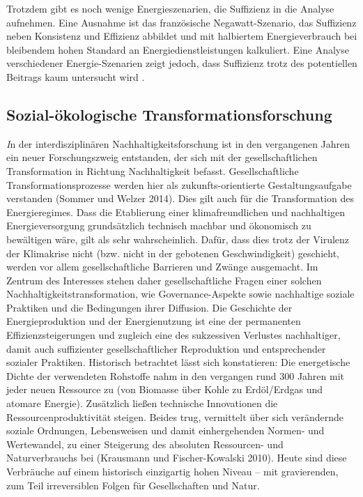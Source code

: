 \documentclass[a4paper,11pt,twoside]{scrartcl}
\begin{document}
Trotzdem gibt es noch wenige Energieszenarien, die Suffizienz in die Analyse aufnehmen. Eine Ausnahme ist das französische Negawatt-Szenario, das Suffizienz neben Konsistenz und Effizienz abbildet \cite{negawatt2017} und mit halbiertem Energieverbrauch bei bleibendem hohen Standard an Energiedienstleistungen kalkuliert. Eine Analyse verschiedener Energie-Szenarien zeigt jedoch, dass Suffizienz trotz des potentiellen Beitrags kaum untersucht wird \cite{SAMADI2017}.


\subsection*{Sozial-ökologische Transformationsforschung}
\textit In der interdisziplinären Nachhaltigkeitsforschung ist in den vergangenen Jahren ein neuer Forschungszweig entstanden, der sich mit der gesellschaftlichen Transformation in Richtung Nachhaltigkeit befasst. Gesellschaftliche Transformationsprozesse werden hier als zukunfts-orientierte Gestaltungsaufgabe verstanden (Sommer und Welzer 2014). Dies gilt auch für die Transformation des Energieregimes. Dass die Etablierung einer klimafreundlichen und nachhaltigen Energieversorgung grundsätzlich technisch machbar und ökonomisch zu bewältigen wäre, gilt als sehr wahrscheinlich. Dafür, dass dies trotz der Virulenz der Klimakrise nicht (bzw. nicht in der gebotenen Geschwindigkeit) geschieht, werden vor allem gesellschaftliche Barrieren und Zwänge ausgemacht. Im Zentrum des Interesses stehen daher gesellschaftliche Fragen einer solchen Nachhaltigkeitstransformation, wie Governance-Aspekte sowie nachhaltige soziale Praktiken und die Bedingungen ihrer Diffusion.
Die Geschichte der Energieproduktion und der Energienutzung ist eine der permanenten Effizienzsteigerungen und zugleich eine des sukzessiven Verlustes nachhaltiger, damit auch suffizienter gesellschaftlicher Reproduktion und entsprechender sozialer Praktiken. Historisch betrachtet lässt sich konstatieren: Die energetische Dichte der verwendeten Rohstoffe nahm in den vergangen rund 300 Jahren mit jeder neuen Ressource zu (von Biomasse über Kohle zu Erdöl/Erdgas und atomare Energie). Zusätzlich ließen technische Innovationen die Ressourcenproduktivität steigen. Beides trug, vermittelt über sich verändernde soziale Ordnungen, Lebensweisen und damit einhergehenden Normen- und Wertewandel, zu einer Steigerung des absoluten Ressourcen- und Naturverbrauchs bei (Krausmann und Fischer-Kowalski 2010). Heute sind diese Verbräuche auf einem historisch einzigartig hohen Niveau – mit gravierenden, zum Teil irreversiblen Folgen für Gesellschaften und Natur.
\end{document}
